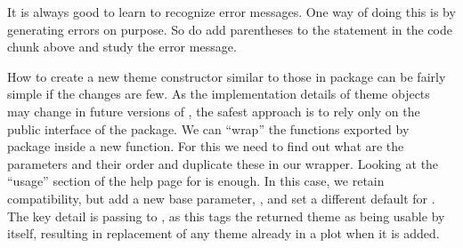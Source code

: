 \documentclass[krantz2]{krantz}\usepackage{knitr}
\begin{document}
\begin{playground}
It is always good to learn to recognize error messages. One way of doing this is by generating errors on purpose. So do add parentheses to the statement in the code chunk above and study the error message.
\end{playground}

\begin{explainbox}
How to create a new theme constructor similar to those in package \ggplot can be fairly simple if the changes are few. As the implementation details of theme objects may change in future versions of \ggplot, the safest approach is to rely only on the public interface of the package. We can ``wrap'' the functions exported by package \ggplot inside a new function. For this we need to find out what are the parameters and their order and duplicate these in our wrapper. Looking at the ``usage'' section of the help page for  is enough. In this case, we retain compatibility, but add a new base parameter, , and set a different default for . The key detail is passing  to , as this tags the returned theme as being usable by itself, resulting in replacement of any theme already in a plot when it is added.

\begin{knitrout}\footnotesize
{}\color{fgcolor}\begin{kframe}
\begin{alltt}
 \hlkwb{<-}
   \hlstd{(} \hlstd{=} \hlstd{,}
             \hlstd{=} \hlstd{,}
             \hlopt{/}\hlstd{,}
             \hlopt{/}\hlstd{,}
             \hlstd{=} \hlstd{) \{}
    \hlstd{(} 
                
                
                 \hlopt{+}
    \hlstd{(} \hlstd{=} \hlstd{(} 
           \hlstd{=} \hlstd{(} 
           \hlstd{=} \hlstd{(} 
           \hlstd{=} \hlstd{(} 
           \hlstd{=} \hlstd{(}   \hlstd{=} \hlstd{)}
  \hlstd{\}}
\end{alltt}
\end{kframe}
\end{knitrout}


\end{explainbox}
\end{document}
